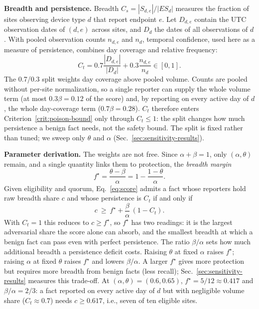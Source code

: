 \documentclass[journal]{IEEEtran}
\theoremstyle{definition}
\begin{document}
\textbf{Breadth and persistence.} Breadth $C_s=|S_{d,e}|/|ES_d|$ measures the fraction of sites observing device type $d$ that report endpoint $e$. Let $D_{d,e}$ contain the UTC observation dates of $(d,e)$ across sites, and $D_d$ the dates of all observations of $d$. With pooled observation counts $n_{d,e}$ and $n_d$, temporal confidence, used here as a measure of persistence, combines day coverage and relative frequency:
\begin{equation}
C_t=0.7\frac{|D_{d,e}|}{|D_d|}+0.3\frac{n_{d,e}}{n_d}\in[0,1].
\label{eq:ct}
\end{equation}
The 0.7/0.3 split weights day coverage above pooled volume. Counts are pooled without per-site normalization, so a single reporter can supply the whole volume term (at most $0.3\beta=0.12$ of the score) and, by reporting on every active day of $d$, the whole day-coverage term ($0.7\beta=0.28$). $C_t$ therefore enters Criterion~\ref{crit:poison-bound} only through $C_t\le1$: the split changes how much persistence a benign fact needs, not the safety bound. The split is fixed rather than tuned; we sweep only $\theta$ and $\alpha$ (Sec.~\ref{sec:sensitivity-results}).

\textbf{Parameter derivation.} The weights are not free. Since $\alpha+\beta=1$, only $(\alpha,\theta)$ remain, and a single quantity links them to protection, the \emph{breadth margin}
\begin{equation}
f^\star=\frac{\theta-\beta}{\alpha}=1-\frac{1-\theta}{\alpha}.
\label{eq:fstar}
\end{equation}
Given eligibility and quorum, Eq.~\ref{eq:score} admits a fact whose reporters hold raw breadth share $c$ and whose persistence is $C_t$ if and only if
\begin{equation}
c\ \ge\ f^\star+\frac{\beta}{\alpha}\,(1-C_t).
\label{eq:benignbreadth}
\end{equation}
With $C_t=1$ this reduces to $c\ge f^\star$, so $f^\star$ has two readings: it is the largest adversarial share the score alone can absorb, and the smallest breadth at which a benign fact can pass even with perfect persistence. The ratio $\beta/\alpha$ sets how much additional breadth a persistence deficit costs. Raising $\theta$ at fixed $\alpha$ raises $f^\star$; raising $\alpha$ at fixed $\theta$ raises $f^\star$ and lowers $\beta/\alpha$. A larger $f^\star$ gives more protection but requires more breadth from benign facts (less recall); Sec.~\ref{sec:sensitivity-results} measures this trade-off. At $(\alpha,\theta)=(0.6,0.65)$, $f^\star=5/12\approx0.417$ and $\beta/\alpha=2/3$: a fact reported on every active day of $d$ but with negligible volume share ($C_t\approx0.7$) needs $c\ge0.617$, i.e., seven of ten eligible sites.
\end{document}
